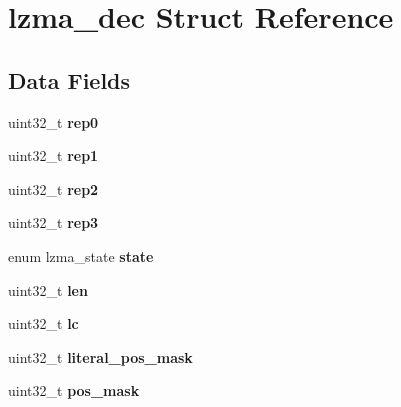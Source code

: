 \hypertarget{structlzma__dec}{}\section{lzma\+\_\+dec Struct Reference}
\label{structlzma__dec}
\subsection*{Data Fields}
\begin{DoxyCompactItemize}
\item 
\mbox{\label{structlzma__dec_a6cdc1914d3f23548bb41d9d80bb53afc}} 
uint32\+\_\+t {\bfseries rep0}
\item 
\mbox{\label{structlzma__dec_a56501d9465b8b932d076711a76c66f26}} 
uint32\+\_\+t {\bfseries rep1}
\item 
\mbox{\label{structlzma__dec_a0dfa7c515a8b9b8778d63f3990ab3ef1}} 
uint32\+\_\+t {\bfseries rep2}
\item 
\mbox{\label{structlzma__dec_a812a53cd493df31967cbbf79e311eea5}} 
uint32\+\_\+t {\bfseries rep3}
\item 
\mbox{\label{structlzma__dec_a446235a997dbedbff9c41bf700beb638}} 
enum lzma\+\_\+state {\bfseries state}
\item 
\mbox{\label{structlzma__dec_a8f535c6b620147ff212b7b7a70662b37}} 
uint32\+\_\+t {\bfseries len}
\item 
\mbox{\label{structlzma__dec_a8d0f32c384fc99c4670d92013de41427}} 
uint32\+\_\+t {\bfseries lc}
\item 
\mbox{\label{structlzma__dec_a45fc347bf3885f06edf44b20dad05d19}} 
uint32\+\_\+t {\bfseries literal\+\_\+pos\+\_\+mask}
\item 
\mbox{\label{structlzma__dec_a297e8ecd1dd0b42922c868823e842ac9}} 
uint32\+\_\+t {\bfseries pos\+\_\+mask}
\item 
\mbox{\label{structlzma__dec_a56d6853e241a687c73f25998e0f003a9}} 

\end{DoxyCompactItemize}
